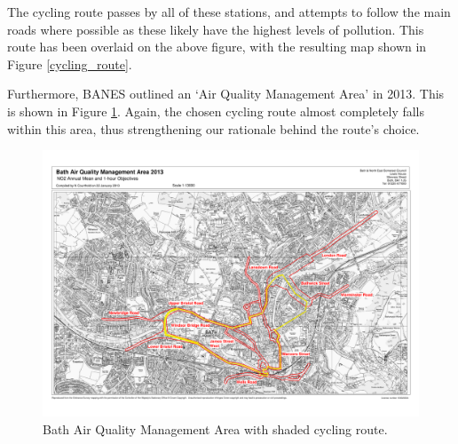 \documentclass[11pt]{report}
\begin{document}
The cycling route passes by all of these stations, and attempts to follow the main roads where possible as these likely have the highest levels of pollution. This route has been overlaid on the above figure, with the resulting map shown in Figure \ref{cycling_route}.

Furthermore, BANES outlined an `Air Quality Management Area' in 2013. This is shown in Figure \ref{aqma}. Again, the chosen cycling route almost completely falls within this area, thus strengthening our rationale behind the route's choice.

\begin{figure}[!tb]
\centering
\includegraphics[width=1\textwidth]{shaded_route}
\caption{Bath Air Quality Management Area \citep{BANES2017baqap} with shaded cycling route.}
\label{aqma}
\end{figure}





\end{document}
